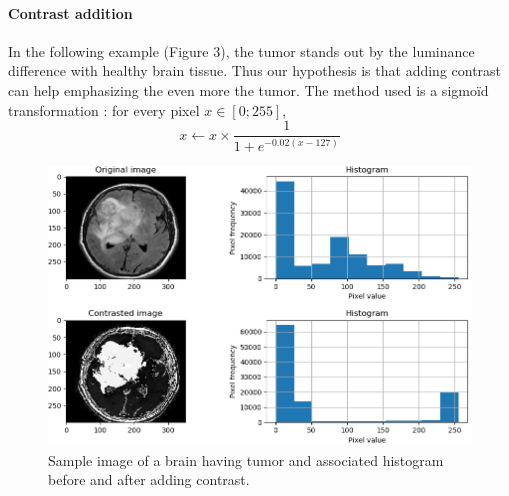 \documentclass[conference]{IEEEtran}
\begin{document}
\paragraph*{Contrast addition}
In the following example (Figure 3), the tumor stands out by the luminance difference with healthy brain tissue. Thus our hypothesis is that adding contrast can help emphasizing the even more the tumor. The method used is a sigmoïd transformation : for every pixel $x \in [0;255]$, $$x\leftarrow x\times \frac{1}{1+e^{-0.02(x-127)}}$$
\begin{figure}[h]
\centering
\includegraphics[scale=0.33]{figures/Contrasting.png}
\caption{Sample image of a brain having tumor and associated histogram before and after adding contrast.}
\end{figure}
\end{document}
